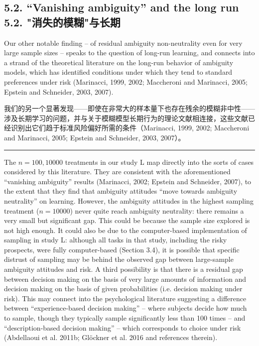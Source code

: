 \documentclass[12pt,a4paper]{article}
\newenvironment{original}
  {\par\vspace{0.5em}\noindent\color{black}\ignorespaces}
  {\par\vspace{0.3em}}
\newenvironment{translation}
  {\par\noindent\color{transblue}\ignorespaces}
  {\par\vspace{0.8em}\hrule\vspace{0.5em}}
\newcommand{\bilingualsubsection}[2]{%
  \subsection{\texorpdfstring{#1 \\[0.2em] {\normalsize\color{transblue}#2}}{#1}}
}
\begin{document}
\bilingualsubsection{5.2. ``Vanishing ambiguity'' and the long run}{5.2. "消失的模糊"与长期}

\begin{original}
Our other notable finding -- of residual ambiguity non-neutrality even for very large sample sizes -- speaks to the question of long-run learning, and connects into a strand of the theoretical literature on the long-run behavior of ambiguity models, which has identified conditions under which they tend to standard preferences under risk (Marinacci, 1999, 2002; Maccheroni and Marinacci, 2005; Epstein and Schneider, 2003, 2007).
\end{original}

\begin{translation}
我们的另一个显著发现——即使在非常大的样本量下也存在残余的模糊非中性——涉及长期学习的问题，并与关于模糊模型长期行为的理论文献相连接，这些文献已经识别出它们趋于标准风险偏好所需的条件（Marinacci, 1999, 2002; Maccheroni and Marinacci, 2005; Epstein and Schneider, 2003, 2007）。
\end{translation}

\begin{original}
The $n = 100, 10000$ treatments in our study L map directly into the sorts of cases considered by this literature. They are consistent with the aforementioned ``vanishing ambiguity'' results (Marinacci, 2002; Epstein and Schneider, 2007), to the extent that they find that ambiguity attitudes ``move towards ambiguity neutrality'' on learning. However, the ambiguity attitudes in the highest sampling treatment ($n = 10000$) never quite reach ambiguity neutrality: there remains a very small but significant gap. This could be because the sample size explored is not high enough. It could also be due to the computer-based implementation of sampling in study L: although all tasks in that study, including the risky prospects, were fully computer-based (Section 3.4), it is possible that specific distrust of sampling may be behind the observed gap between large-sample ambiguity attitudes and risk. A third possibility is that there is a residual gap between decision making on the basis of very large amounts of information and decision making on the basis of given probabilities (i.e. decision making under risk). This may connect into the psychological literature suggesting a difference between ``experience-based decision making'' -- where subjects decide how much to sample, though they typically sample significantly less than 100 times -- and ``description-based decision making'' -- which corresponds to choice under risk (Abdellaoui et al. 2011b; Gl\"{o}ckner et al. 2016 and references therein).
\end{original}
\end{document}
